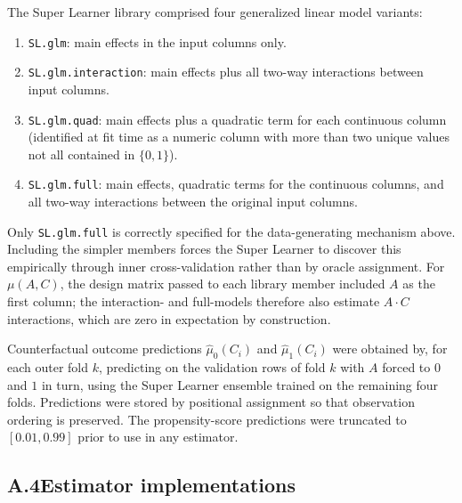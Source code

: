 \documentclass[12pt]{article}
\begin{document}
The Super Learner library comprised four generalized linear model variants:
\begin{enumerate}
\item \texttt{SL.glm}: main effects in the input columns only.
\item \texttt{SL.glm.interaction}: main effects plus all two-way interactions between input columns.
\item \texttt{SL.glm.quad}: main effects plus a quadratic term for each continuous column (identified at fit time as a numeric column with more than two unique values not all contained in $\{0,1\}$).
\item \texttt{SL.glm.full}: main effects, quadratic terms for the continuous columns, and all two-way interactions between the original input columns.
\end{enumerate}
Only \texttt{SL.glm.full} is correctly specified for the data-generating mechanism above. Including the simpler members forces the Super Learner to discover this empirically through inner cross-validation rather than by oracle assignment. For $\mu(A, C)$, the design matrix passed to each library member included $A$ as the first column; the interaction- and full-models therefore also estimate $A \cdot C$ interactions, which are zero in expectation by construction.

Counterfactual outcome predictions $\hat\mu_0(C_i)$ and $\hat\mu_1(C_i)$ were obtained by, for each outer fold $k$, predicting on the validation rows of fold $k$ with $A$ forced to $0$ and $1$ in turn, using the Super Learner ensemble trained on the remaining four folds. Predictions were stored by positional assignment so that observation ordering is preserved. The propensity-score predictions were truncated to $[0.01, 0.99]$ prior to use in any estimator.

\subsection*{A.4\quad Estimator implementations}
\end{document}

